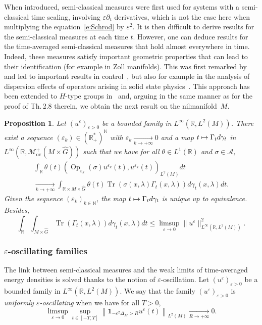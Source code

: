 \documentclass[10pt]{amsart}
\let\mathcal\mathscr
\newcommand\mto{\mathchoice{\longmapsto}{\mapsto}{\mapsto}{\mapsto}}
\newcommand{\rov}{\mathrm{ov}}
\newcommand{\bun}{\mathbf{1}}
\DeclareMathOperator{\Op}{Op}
\DeclareMathOperator{\Tr}{Tr}
\theoremstyle{plain}
\newtheorem{proposition}[theorem]{Proposition}
\theoremstyle{definition}
\let\eps\varepsilon
\def\R{{\mathbb R}}
\def\N{{\mathbb N}}
\newcommand{\Tend}[2]{\mathbin{\mathop{\longrightarrow}\limits_{#1\to#2}}}
\begin{document}
When introduced, semi-classical measures were first used for systems with a semi-classical time scaling, \ie involving $\eps \partial_t$ derivatives, which is not the case here when multiplying the equation~\eqref{e:Schrod} by $\eps^2$. It is then difficult to derive results for the semi-classical measures at each time $t$. However, one can deduce results for the time-averaged semi-classical measures that hold almost everywhere in time. Indeed, these measures satisfy important geometric properties that can lead to their identification (for example in Zoll manifolds).
This was first remarked by~\cite{MaciaTorus} and led to important results in control~\cite{AM14,AFM15, MacRiv19}, but also for example in the analysis of dispersion effects of operators arising in solid state physics~\cite{CFM19,CFM20}. This approach has been extended to $H$-type groups in~\cite{FF} and, arguing in the same manner as for the proof of Th.\,2.8 therein, we obtain the next result on the nilmanifold~$M$.

\begin{proposition}\label{prop:semiclas}
Let $(u^\eps)_{\eps>0}$ be a bounded family in $L^\infty(\R,L^2(M))$. There exist a sequence $(\eps_k)\in(\R_+^*)^{\N}$ with $\eps_k \underset{k\to +\infty}{\longrightarrow} 0$ and a map $t\mto \Gamma_t d\gamma_t$ in $L^\infty(\R,\mathcal{M}_{\rov}^+(M\times \widehat{G}))$ such that we have for all $\theta\in L^1(\R)$ and $\sigma\in\mathcal{A}$,
\begin{multline*}
\int_\R \theta(t)(\Op_{\eps_k}(\sigma)u^{\eps_k}(t),u^{\eps_k}(t))_{L^2(M)} dt\\[-8pt]
\underset{k\to +\infty}{\longrightarrow} \int_{\R\times M\times\widehat{G}} \theta(t)\Tr(\sigma(x,\lambda)\Gamma_t(x,\lambda))d\gamma_t(x,\lambda)dt.
\end{multline*}
Given the sequence $(\eps_k)_{k\in\N}$, the map $t\mto \Gamma_td\gamma_t$ is unique up to equivalence. Besides,
\begin{equation*}
\int_\R\int_{M\times \widehat{G}}\Tr(\Gamma_t(x,\lambda))d\gamma_t(x,\lambda)dt\leq \limsup_{\eps\to 0}\|u^\eps\|^2_{L^\infty(\R,L^2(M))}.
\end{equation*}
\end{proposition}

\subsubsection{$\eps$-oscillating families} \label{s:epsosc}
The link between semi-classical measures and the weak limits of time-averaged energy densities is solved thanks to the notion of $\eps$-oscillation.
Let $(u^\eps)_{\eps>0}$ be a bounded family in $L^\infty(\R,L^2(M))$.
We say that the family $(u^\eps)_{\eps>0}$ is \emph{uniformly $\eps$-oscillating} when we have for all $T>0$,
\[
\limsup_{\eps\to 0} \sup_{t\in[-T,T]} \left\|\bun_{-\eps^2{\Delta}_M>R} u^\eps(t)
\right\|_{L^2(M)}\Tend{R}{+\infty}0.
\]
\end{document}
